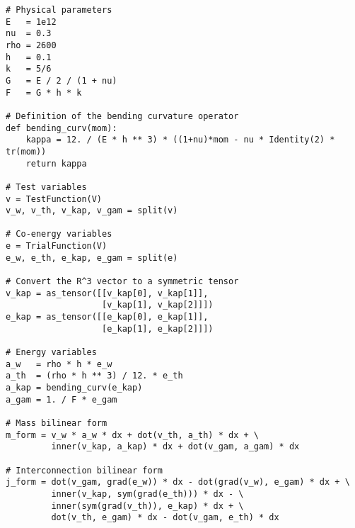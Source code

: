 \begin{tcolorbox}[title = Definition of the variational form (\fenics \& \firedrake), coltitle=white, breakable, size=fbox, boxrule=1pt, pad at break*=1mm, enlarge top by=0.25em, enlarge bottom by=0.5em]
\begin{Verbatim}[tabsize=4]
# Physical parameters 
E   = 1e12
nu  = 0.3	
rho = 2600
h   = 0.1
k   = 5/6	
G   = E / 2 / (1 + nu)
F   = G * h * k

# Definition of the bending curvature operator
def bending_curv(mom):
	kappa = 12. / (E * h ** 3) * ((1+nu)*mom - nu * Identity(2) * tr(mom))
	return kappa
	
# Test variables
v = TestFunction(V)
v_w, v_th, v_kap, v_gam = split(v)	

# Co-energy variables
e = TrialFunction(V)
e_w, e_th, e_kap, e_gam = split(e)

# Convert the R^3 vector to a symmetric tensor
v_kap = as_tensor([[v_kap[0], v_kap[1]],
				   [v_kap[1], v_kap[2]]])
e_kap = as_tensor([[e_kap[0], e_kap[1]],
				   [e_kap[1], e_kap[2]]])
			
# Energy variables   
a_w   = rho * h * e_w
a_th  = (rho * h ** 3) / 12. * e_th
a_kap = bending_curv(e_kap)
a_gam = 1. / F * e_gam

# Mass bilinear form 
m_form = v_w * a_w * dx + dot(v_th, a_th) * dx + \
		 inner(v_kap, a_kap) * dx + dot(v_gam, a_gam) * dx 

# Interconnection bilinear form
j_form = dot(v_gam, grad(e_w)) * dx - dot(grad(v_w), e_gam) * dx + \
		 inner(v_kap, sym(grad(e_th))) * dx - \
		 inner(sym(grad(v_th)), e_kap) * dx + \
		 dot(v_th, e_gam) * dx - dot(v_gam, e_th) * dx
\end{Verbatim}
\end{tcolorbox}

